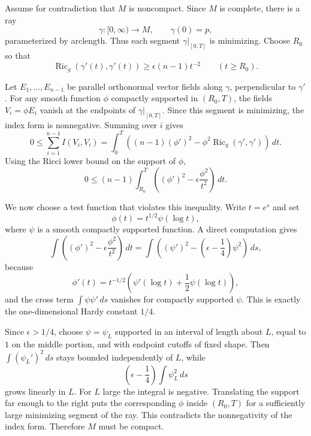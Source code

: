 \begin{solution}
Assume for contradiction that $M$ is noncompact. Since $M$ is complete, there is a
ray
\[
    \gamma:[0,\infty)\to M,\qquad \gamma(0)=p,
\]
parameterized by arclength. Thus each segment $\gamma|_{[0,T]}$ is minimizing.
Choose $R_0$ so that
\[
    \operatorname{Ric}_g(\gamma'(t),\gamma'(t))
    \geq
    \epsilon(n-1)t^{-2}
    \qquad (t\geq R_0).
\]

Let $E_1,\ldots,E_{n-1}$ be parallel orthonormal vector fields along $\gamma$,
perpendicular to $\gamma'$. For any smooth function $\phi$ compactly supported in
$(R_0,T)$, the fields $V_i=\phi E_i$ vanish at the endpoints of
$\gamma|_{[0,T]}$. Since this segment is minimizing, the index form is
nonnegative. Summing over $i$ gives
\[
    0\leq
    \sum_{i=1}^{n-1} I(V_i,V_i)
    =
    \int_0^T
    \left((n-1)(\phi')^2
    -\phi^2\operatorname{Ric}_g(\gamma',\gamma')\right)\,dt.
\]
Using the Ricci lower bound on the support of $\phi$,
\[
    0\leq
    (n-1)\int_{R_0}^T
    \left((\phi')^2-\epsilon\frac{\phi^2}{t^2}\right)\,dt.
\]

We now choose a test function that violates this inequality. Write $t=e^s$ and set
\[
    \phi(t)=t^{1/2}\psi(\log t),
\]
where $\psi$ is a smooth compactly supported function. A direct computation gives
\[
    \int
    \left((\phi')^2-\epsilon\frac{\phi^2}{t^2}\right)\,dt
    =
    \int
    \left((\psi')^2-\left(\epsilon-\frac{1}{4}\right)\psi^2\right)\,ds,
\]
because
\[
    \phi'(t)=t^{-1/2}\left(\psi'(\log t)+\frac12\psi(\log t)\right),
\]
and the cross term $\int \psi\psi'\,ds$ vanishes for compactly supported
$\psi$. This is exactly the one-dimensional Hardy constant $1/4$.

Since $\epsilon>1/4$, choose $\psi=\psi_L$ supported in an interval of length
about $L$, equal to $1$ on the middle portion, and with endpoint cutoffs of fixed
shape. Then $\int(\psi_L')^2\,ds$ stays bounded independently of $L$, while
\[
    \left(\epsilon-\frac14\right)\int\psi_L^2\,ds
\]
grows linearly in $L$. For $L$ large the integral is negative. Translating the
support far enough to the right puts the corresponding $\phi$ inside
$(R_0,T)$ for a sufficiently large minimizing segment of the ray. This
contradicts the nonnegativity of the index form. Therefore $M$ must be compact.


\end{solution}
